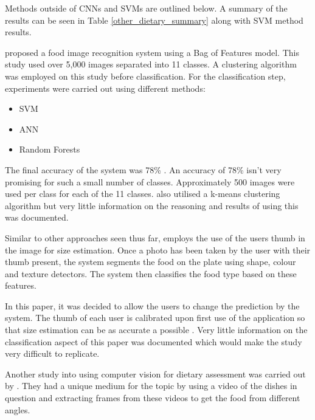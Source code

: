Methods outside of CNNs and SVMs are outlined below.
A summary of the results can be seen in Table \ref{other_dietary_summary} along with SVM method results.

\parencite{LSL_2015} proposed a food image recognition system using a Bag of Features model.
This study used over 5,000 images separated into 11 classes.
A clustering algorithm was employed on this study before classification.
For the classification step, experiments were carried out using different methods:
\begin{itemize}
	\item{SVM}
	\item{ANN}
	\item{Random Forests}
\end{itemize}

The final accuracy of the system was 78\% \parencite{LSL_2015}.
An accuracy of 78\% isn't very promising for such a small number of classes.
Approximately 500 images were used per class for each of the 11 classes.
\parencite{LSL_2015} also utilised a k-means clustering algorithm but very little information on the reasoning and results of using this was documented.


Similar to other approaches seen thus far, \parencite{personalAssistive} employs the use of the users thumb in the image for size estimation.
Once a photo has been taken by the user with their thumb present, the system segments the food on the plate using shape, colour and texture detectors.
The system then classifies the food type based on these features.

In this paper, it was decided to allow the users to change the prediction by the system.
The thumb of each user is calibrated upon first use of the application so that size estimation can be as accurate a possible \parencite{personalAssistive}.
Very little information on the classification aspect of this paper was documented which would make the study very difficult to replicate. 

Another study into using computer vision for dietary assessment was carried out by \parencite{chen2010toward}. They had a unique medium for the topic by using a video of the dishes in question and extracting frames from these videos to get the food from different angles.

